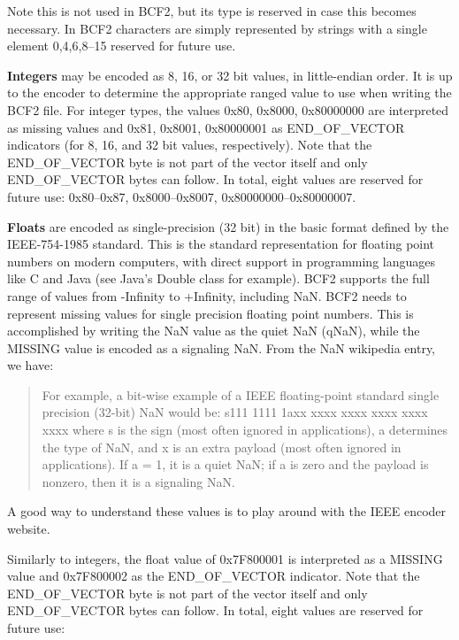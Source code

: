 \documentclass[8pt]{article}
\begin{document}
Note this is not used in BCF2, but its type is reserved in case this becomes necessary.
In BCF2 characters are simply represented by strings with a single element 0,4,6,8--15 reserved for future use.

\vspace{0.3cm}

\textbf{Integers} may be encoded as 8, 16, or 32 bit values, in little-endian order.
It is up to the encoder to determine the appropriate ranged value to use when writing the BCF2 file.
For integer types, the values 0x80, 0x8000, 0x80000000 are interpreted as missing values and 0x81, 0x8001, 0x80000001 as END\_OF\_VECTOR indicators (for 8, 16, and 32 bit values, respectively).
Note that the END\_OF\_VECTOR byte is not part of the vector itself and only END\_OF\_VECTOR bytes can follow.
In total, eight values are reserved for future use: 0x80--0x87, 0x8000--0x8007, 0x80000000--0x80000007.

\vspace{0.3cm}
\textbf{Floats} are encoded as single-precision (32 bit) in the basic format defined by the IEEE-754-1985 standard.
This is the standard representation for floating point numbers on modern computers, with direct support in programming languages like C and Java (see Java's Double class for example).
BCF2 supports the full range of values from -Infinity to +Infinity, including NaN.
BCF2 needs to represent missing values for single precision floating point numbers.
This is accomplished by writing the NaN value as the quiet NaN (qNaN), while the MISSING value is encoded as a signaling NaN.
From the NaN wikipedia entry, we have:

\begin{quote}
For example, a bit-wise example of a IEEE floating-point standard single precision (32-bit) NaN would be: s111 1111 1axx xxxx xxxx xxxx xxxx xxxx where s is the sign (most often ignored in applications), a determines the type of NaN, and x is an extra payload (most often ignored in applications).
If a = 1, it is a quiet NaN; if a is zero and the payload is nonzero, then it is a signaling NaN.
\end{quote}

\noindent A good way to understand these values is to play around with the IEEE encoder website.

\vspace{0.3cm}
\noindent Similarly to integers, the float value of 0x7F800001 is interpreted as a MISSING value and 0x7F800002 as the END\_OF\_VECTOR indicator. 
Note that the END\_OF\_VECTOR byte is not part of the vector itself and only END\_OF\_VECTOR bytes can follow.
In total, eight values are reserved for future use:
\end{document}
